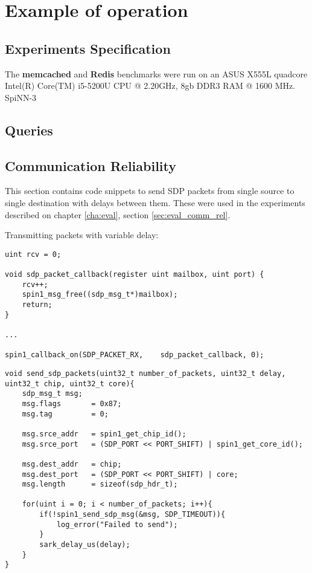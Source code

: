 \chapter{Example of operation}

\section{Experiments Specification}
\label{sec:appendix-specs}

The \textbf{memcached} and \textbf{Redis} benchmarks were run on an ASUS X555L quadcore Intel(R) Core(TM) i5-5200U CPU @ 2.20GHz, 8gb DDR3 RAM @ 1600 MHz. SpiNN-3


\section{Queries}
\label{sec:appendix-queries}



\section{Communication Reliability}
\label{sec:appendix_comm_rel}

This section contains code snippets to send SDP packets from single source to single destination with delays between them. These were used in the experiments described on chapter \ref{cha:eval}, section \ref{sec:eval_comm_rel}.

Transmitting packets with variable delay:

\begin{lstlisting}[caption={Source}]
uint rcv = 0;

void sdp_packet_callback(register uint mailbox, uint port) {
    rcv++;
    spin1_msg_free((sdp_msg_t*)mailbox);
    return;
}

...

spin1_callback_on(SDP_PACKET_RX,    sdp_packet_callback, 0);

\end{lstlisting}

\begin{lstlisting}[caption={Destination}]
void send_sdp_packets(uint32_t number_of_packets, uint32_t delay, uint32_t chip, uint32_t core){
	sdp_msg_t msg;
    msg.flags       = 0x87;
    msg.tag         = 0;

    msg.srce_addr   = spin1_get_chip_id();
    msg.srce_port   = (SDP_PORT << PORT_SHIFT) | spin1_get_core_id();

    msg.dest_addr   = chip;
    msg.dest_port   = (SDP_PORT << PORT_SHIFT) | core;
    msg.length 		= sizeof(sdp_hdr_t);

    for(uint i = 0; i < number_of_packets; i++){
    	if(!spin1_send_sdp_msg(&msg, SDP_TIMEOUT)){
        	log_error("Failed to send");
        }
        sark_delay_us(delay);
    }
}
\end{lstlisting}

